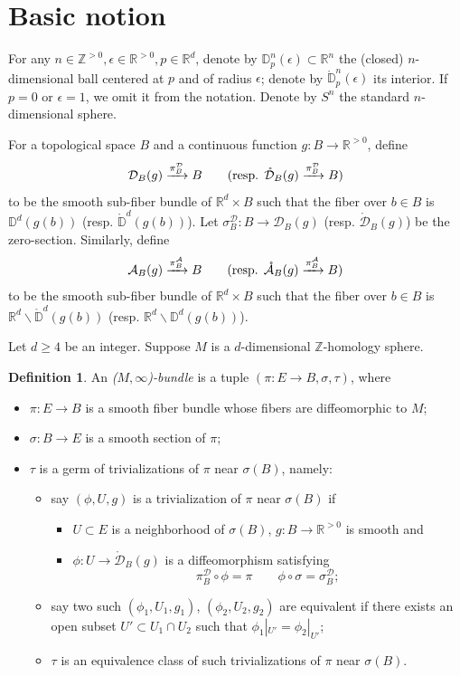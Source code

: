 \documentclass[11pt]{article}
\theoremstyle{definition}
\newtheorem{dfn}[thm]{Definition}
\theoremstyle{remark}
\def\mr#1{{\mathring{#1}}}
\def\Z{\mathbb{Z}}
\def\R{\mathbb{R}}
\def\D{\mathbb{D}}
\def\cA{\mathcal{A}}
\def\cD{\mathcal{D}}
\def\tn#1{\textnormal{#1}}
\begin{document}
\setlength{\parskip}{\baselineskip}
\setlength{\parindent}{0cm}

\section{Basic notion}

For any $n\in\Z^{>0},\epsilon\in\R^{>0},p\in\R^d$, denote by $\D^n_p(\epsilon)\subset\R^n$ the (closed) $n$-dimensional ball centered at $p$ and of radius $\epsilon$; denote by $\mr\D^n_p(\epsilon)$ its interior. 
If $p=0$ or $\epsilon=1$, we omit it from the notation. 
Denote by $S^{n}$ the standard $n$-dimensional sphere. 

For a topological space $B$ and a continuous function $g: B\to \R^{>0}$, define
$$\cD_B(g)\xrightarrow{\pi^\cD_{B}} B\qquad
(\tn{resp. } \mr\cD_B(g)\xrightarrow{\pi^\cD_B} B)$$
to be the smooth sub-fiber bundle of $\R^d\times B$ such that the fiber over $b\in B$ is $\D^d(g(b))$ (resp. $\mr\D^d(g(b))$). 
Let $\sigma_B^\cD:B\to \cD_B(g)$ (resp. $\mr\cD_B(g)$) be the zero-section. 
Similarly, define
$$\cA_B(g)\xrightarrow{\pi^\cA_B} B\qquad
(\tn{resp. } \mr\cA_B(g)\xrightarrow{\pi^\cA_B} B)$$
to be the smooth sub-fiber bundle of $\R^d\times B$ such that the fiber over $b\in B$ is $\R^d\backslash\mr\D^d(g(b))$ (resp. $\R^d\backslash\D^d(g(b))$). 

Let $d\geq4$ be an integer. Suppose $M$ is a $d$-dimensional $\Z$-homology sphere. 

\begin{dfn}
An {\it ($M,\infty$)-bundle} is a tuple $(\pi:E\to B,\sigma,\tau)$, where
\begin{itemize}
\item $\pi:E\to B$ is a smooth fiber bundle whose fibers are diffeomorphic to $M$;
\item $\sigma:B\to E$ is a smooth section of $\pi$; 
\item $\tau$ is a germ of trivializations of $\pi$ near $\sigma(B)$, namely: 
\begin{itemize}
\item say $(\phi, U,g)$ is a trivialization of $\pi$ near $\sigma(B)$ if 
\begin{itemize}
\item $U\subset E$ is a neighborhood of $\sigma(B)$, $g:B\to\R^{>0}$ is smooth and 
\item $\phi: U\to \mr{\cD}_B(g)$ is a diffeomorphism satisfying 
$$\pi^\cD_{B}\circ\phi=\pi\qquad \phi\circ\sigma=\sigma^\cD_B;$$
\end{itemize}
\item say two such $(\phi_1,U_1,g_1)$, $(\phi_2,U_2,g_2)$ are equivalent if there exists an open subset $U'\subset U_1\cap U_2$ such that $\phi_1|_{U'}=\phi_2|_{U'}$; 
\item $\tau$ is an equivalence class of such trivializations of $\pi$ near $\sigma(B)$. 
\end{itemize}
\end{itemize}
\end{dfn}
\end{document}
